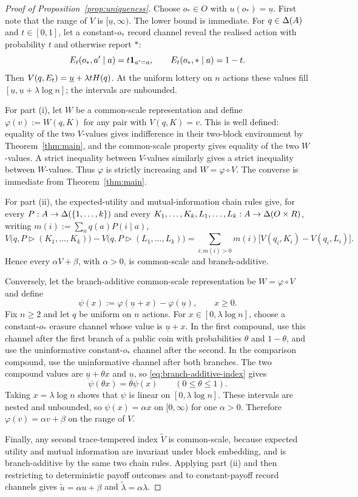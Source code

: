 \begin{proof}[Proof of Proposition~\ref{prop:uniqueness}]
Choose $o_*\in O$ with $u(o_*)=\underline u$.  First note that the range of $V$ is
$[\underline u,\infty)$.  The lower bound is immediate.  For $q\in\Delta(A)$ and $t\in[0,1]$, let a constant-$o_*$
record channel reveal the realised action with
probability $t$ and otherwise report $*$:
\[
 E_t(o_*,a'\mid a)=t\mathbf 1_{a'=a},
 \qquad
 E_t(o_*,*\mid a)=1-t.
\]
Then $V(q,E_t)=\underline u+\lambda tH(q)$.  At the uniform lottery on $n$ actions these values fill
$[\underline u,\underline u+\lambda\log n]$; the intervals are unbounded.

For part \textup{(i)}, let $W$ be a common-scale representation and define
$\varphi(v):=W(q,K)$ for any pair with $V(q,K)=v$.  This is well defined: equality of the two $V$-values gives
indifference in their two-block environment by Theorem~\ref{thm:main}, and the common-scale property gives equality
of the two $W$-values.  A strict inequality between $V$-values similarly gives a strict inequality between
$W$-values.  Thus $\varphi$ is strictly increasing and $W=\varphi\circ V$.  The converse is immediate from
Theorem~\ref{thm:main}.

For part \textup{(ii)}, the expected-utility and mutual-information chain rules give, for every
$P:A\to\Delta(\{1,\ldots,k\})$ and every
$K_1,\ldots,K_k,L_1,\ldots,L_k:A\to\Delta(O\times R)$, writing
$m(i):=\sum_aq(a)P(i\mid a)$,
\[
 V\bigl(q,P\triangleright(K_1,\ldots,K_k)\bigr)
 -V\bigl(q,P\triangleright(L_1,\ldots,L_k)\bigr)
 =\sum_{i:m(i)>0}m(i)
 \bigl[V(q_i,K_i)-V(q_i,L_i)\bigr].
\]
Hence every $\alpha V+\beta$, with $\alpha>0$, is common-scale and branch-additive.

Conversely, let the branch-additive common-scale representation be $W=\varphi\circ V$ and define
\[
 \psi(x):=\varphi(\underline u+x)-\varphi(\underline u),
 \qquad x\ge0.
\]
Fix $n\ge2$ and let $q$ be uniform on $n$ actions.  For $x\in[0,\lambda\log n]$, choose a constant-$o_*$ erasure
channel whose value is $\underline u+x$.  In the first compound, use this channel after the first branch
of a public coin with probabilities $\theta$ and $1-\theta$, and use the uninformative constant-$o_*$ channel after
the second.  In the comparison compound, use the uninformative channel after both branches.  The two compound values
are $\underline u+\theta x$ and $\underline u$, so \eqref{eq:branch-additive-index} gives
\[
 \psi(\theta x)=\theta\psi(x)
 \qquad(0\le\theta\le1).
\]
Taking $x=\lambda\log n$ shows that $\psi$ is linear on $[0,\lambda\log n]$.  These intervals are nested and
unbounded, so $\psi(x)=\alpha x$ on $[0,\infty)$ for one $\alpha>0$.  Therefore
$\varphi(v)=\alpha v+\beta$ on the range of $V$.

Finally, any second trace-tempered index $\widetilde V$ is common-scale, because expected utility and mutual
information are invariant under block embedding, and is branch-additive by the same two chain rules.  Applying
part \textup{(ii)} and then restricting to deterministic payoff outcomes and to constant-payoff record channels gives
$\widetilde u=\alpha u+\beta$ and $\widetilde\lambda=\alpha\lambda$.
\end{proof}

